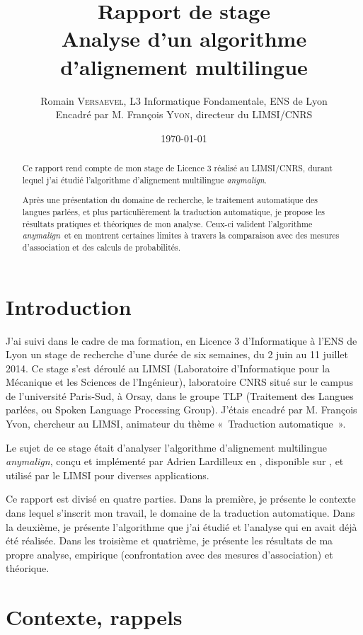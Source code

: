 \documentclass[a4paper,10pt]{article}
\title{ \Large Rapport de stage \\ \LARGE Analyse d'un algorithme d'alignement multilingue}
\author{\normalsize Romain \textsc{Versaevel}, L3 Informatique Fondamentale, ENS de Lyon \\ \normalsize Encadré par M. François \textsc{Yvon}, directeur du LIMSI/CNRS \\}
\date{\today}
\newcommand{\anym}{\emph{anymalign}}
\newcommand{\guill}[1]{«~#1~»}
\begin{document}
\maketitle

\begin{abstract}
Ce rapport rend compte de mon stage de Licence 3 réalisé au LIMSI/CNRS, durant lequel j'ai étudié l'algorithme d'alignement multilingue \anym .

Après une présentation du domaine de recherche, le traitement automatique des langues parlées, et plus particulièrement la traduction automatique, je propose les résultats pratiques et théoriques de mon analyse. Ceux-ci valident l'algorithme \anym~et en montrent certaines limites à travers la comparaison avec des mesures d'association et des calculs de probabilités.
\end{abstract}

\newpage
\tableofcontents
\newpage

\section{Introduction}
J'ai suivi dans le cadre de ma formation, en Licence 3 d'Informatique à l'ENS de Lyon un stage de recherche d'une durée de six semaines, du 2 juin au 11 juillet 2014. Ce stage s'est déroulé au LIMSI (Laboratoire d'Informatique pour la Mécanique et les Sciences de l'Ingénieur), laboratoire CNRS situé sur le campus de l'université Paris-Sud, à Orsay, dans le groupe TLP (Traitement des Langues parlées, ou Spoken Language Processing Group). J'étais encadré par M. François Yvon, chercheur au LIMSI, animateur du thème \guill{Traduction automatique}.

Le sujet de ce stage était d'analyser l'algorithme d'alignement multilingue \anym, conçu et implémenté par Adrien Lardilleux
en
, disponible sur \cite{anymalign}, et utilisé par le LIMSI pour diverses applications.

Ce rapport est divisé en quatre parties. Dans la première, je présente le contexte dans lequel s'inscrit mon travail, le domaine de la traduction automatique. Dans la deuxième, je présente l'algorithme que j'ai étudié et l'analyse qui en avait déjà été réalisée. Dans les troisième et quatrième, je présente les résultats de ma propre analyse, empirique (confrontation avec des mesures d'association) et théorique.



\section{Contexte, rappels}
\end{document}
